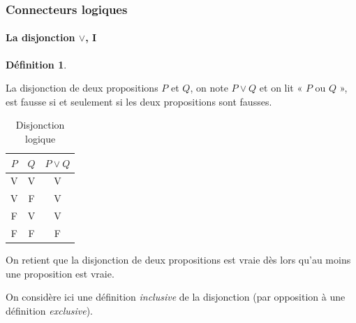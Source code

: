\documentclass[10pt,notheorems]{beamer}
\theoremstyle{plain}
\theoremstyle{definition} %
\newtheorem{definition}{Définition}
\begin{document}
  \begin{frame}
    \frametitle{Connecteurs logiques}
    \framesubtitle{La disjonction $\lor$, I}
    \hypertarget{slide_disjonction_1}{}

    \begin{definition}\label{def:disjonction}

    La disjonction de deux propositions $P$ et $Q$, on note $P\lor Q$
    et on lit « $P$ ou $Q$ », est fausse si et seulement si les
    deux propositions sont fausses.
  \end{definition}

  \bigskip

  \begin{table}[H]

    \centering
    \begin{tabular}[H]{|cc|c|}
      \hline
      $P$ & $Q$ & $P \lor Q$\\ \hline
      V & V & V \\
      V & F & V \\
      F & V & V \\
      F & F & F \\
      \hline\hline
    \end{tabular}
    \caption{Disjonction logique}
    \label{tab:disjonction}
  \end{table}

  \bigskip

  On retient que la disjonction de deux propositions est vraie dès
  lors qu'au moins une proposition est vraie.

  \bigskip

  On considère ici une définition \textit{inclusive} de la disjonction (par opposition à une définition \textit{exclusive}).

  \end{frame}
\end{document}
